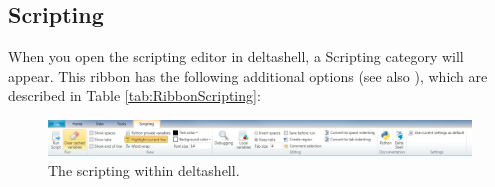 
\subsection{Scripting}\label{ssec:scriptingeditorribbon}

When you open the scripting editor in deltashell, a Scripting  category will appear. This ribbon has the following additional options (see also ), which are described in Table \ref{tab:RibbonScripting}:
%
\begin{figure}[H]
\centering
\includegraphics[width=\textwidth]{figures/Ribbon.png}
\caption{The scripting  within deltashell.}
\label{Fig:RibbonScripting}
\end{figure}

